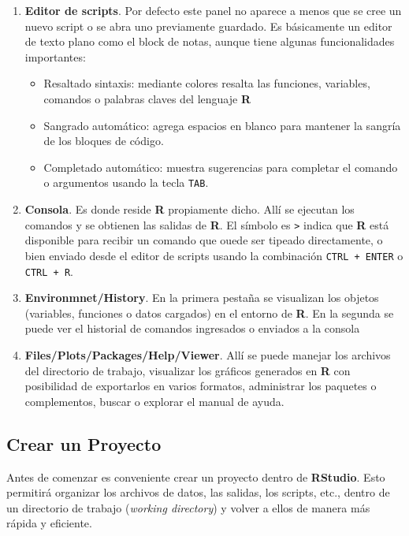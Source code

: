 \documentclass[a4paper]{book}
\providecommand{\tightlist}{%
  \setlength{\itemsep}{0pt}\setlength{\parskip}{0pt}}
\begin{document}
\begin{enumerate}
\def\labelenumi{\arabic{enumi}.}
\item
  \textbf{Editor de scripts}. Por defecto este panel no aparece a menos
  que se cree un nuevo script o se abra uno previamente guardado. Es
  básicamente un editor de texto plano como el block de notas, aunque
  tiene algunas funcionalidades importantes:

  \begin{itemize}
  \tightlist
  \item
    Resaltado sintaxis: mediante colores resalta las funciones,
    variables, comandos o palabras claves del lenguaje \textbf{R}
  \item
    Sangrado automático: agrega espacios en blanco para mantener la
    sangría de los bloques de código.
  \item
    Completado automático: muestra sugerencias para completar el comando
    o argumentos usando la tecla \texttt{TAB}.
  \end{itemize}
\item
  \textbf{Consola}. Es donde reside \textbf{R} propiamente dicho. Allí
  se ejecutan los comandos y se obtienen las salidas de \textbf{R}. El
  símbolo es \texttt{\textgreater{}} indica que \textbf{R} está
  disponible para recibir un comando que ouede ser tipeado directamente,
  o bien enviado desde el editor de scripts usando la combinación
  \texttt{CTRL\ +\ ENTER} o \texttt{CTRL\ +\ R}.
\item
  \textbf{Environmnet/History}. En la primera pestaña se visualizan los
  objetos (variables, funciones o datos cargados) en el entorno de
  \textbf{R}. En la segunda se puede ver el historial de comandos
  ingresados o enviados a la consola
\item
  \textbf{Files/Plots/Packages/Help/Viewer}. Allí se puede manejar los
  archivos del directorio de trabajo, visualizar los gráficos generados
  en \textbf{R} con posibilidad de exportarlos en varios formatos,
  administrar los paquetes o complementos, buscar o explorar el manual
  de ayuda.
\end{enumerate}

\hypertarget{crear-un-proyecto}{%
\subsection{Crear un Proyecto}\label{crear-un-proyecto}}

Antes de comenzar es conveniente crear un proyecto dentro de
\textbf{RStudio}. Esto permitirá organizar los archivos de datos, las
salidas, los scripts, etc., dentro de un directorio de trabajo
(\emph{working directory}) y volver a ellos de manera más rápida y
eficiente.
\end{document}
